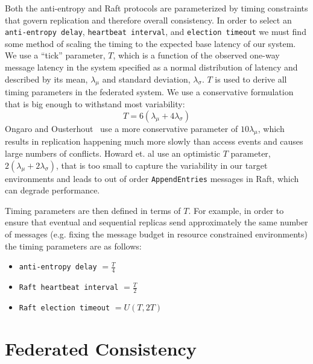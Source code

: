 \documentclass[10pt,conference,letterpaper]{IEEEtran}
\begin{document}
Both the anti-entropy and Raft protocols are parameterized by timing constraints that govern replication and therefore overall consistency.
In order to select an \texttt{anti-entropy delay}, \texttt{heartbeat
interval}, and \texttt{election timeout} we must find some method of
scaling the timing to the expected base latency of our system.
We use a ``tick'' parameter, $T$, which is a function of
the observed one-way message latency in the system specified as a normal distribution of latency and described by its mean, $\lambda_{\mu}$ and standard deviation,
$\lambda_{\sigma}$.
$T$ is used to derive all timing parameters in the federated system.
We use a conservative formulation that is
big enough to withstand most variability:
\begin{equation}
    T = 6(\lambda_{\mu} + 4\lambda_{\sigma})
\end{equation}
Ongaro and Ousterhout~\cite{ongaro_search_2014} use a more conservative
parameter of $10\lambda_{\mu}$, which results in replication happening much
more slowly than access events and causes large numbers of conflicts.
Howard et.
al \cite{howard_raft_2015} use an
optimistic $T$ parameter, $2\left(\lambda_{\mu} + 2\lambda_{\sigma}\right)$, that is too small to capture
the variability in our target environments and leads to out of order
\texttt{AppendEntries} messages in Raft, which can degrade performance.

Timing parameters are then defined in terms of $T$.
For example, in order to ensure that eventual and sequential replicas send approximately
the same number of messages (e.g.
fixing the message budget in resource constrained environments) the timing
parameters are as follows:
\begin{itemize}
    \item \texttt{anti-entropy delay} $= \frac{T}{4}$
    \item \texttt{Raft heartbeat interval} $= \frac{T}{2}$
    \item \texttt{Raft election timeout} $= U(T, 2T)$
\end{itemize}


\section{Federated Consistency}
\end{document}
